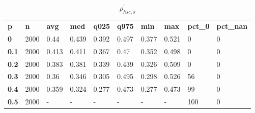 \begin{table}[h]
 \centering 
\footnotesize
\caption{$\rho_{hsc,s}^\prime $}
\label{tab:alphahscs}
\begin{tabular}[h]{| l l l l l l l l l l|
    } \hline
\textbf{ p} & \textbf{ n} & \textbf{ avg} & \textbf{ med} & \textbf{ q025} & \textbf{ q975} & \textbf{ min} & \textbf{ max} & \textbf{ pct\_0} & \textbf{ pct\_nan}
           \\
  \textbf{  0} & 2000 &  0.44 & 0.439 & 0.392 & 0.497 & 0.377 & 0.521 &   0 & 0
           \\
  \textbf{0.1} & 2000 & 0.413 & 0.411 & 0.367 &  0.47 & 0.352 & 0.498 &   0 & 0
           \\
  \textbf{0.2} & 2000 & 0.383 & 0.381 & 0.339 & 0.439 & 0.326 & 0.509 &   0 & 0
           \\
  \textbf{0.3} & 2000 &  0.36 & 0.346 & 0.305 & 0.495 & 0.298 & 0.526 &  56 & 0
           \\
  \textbf{0.4} & 2000 & 0.359 & 0.324 & 0.277 & 0.473 & 0.277 & 0.473 &  99 & 0
           \\
  \textbf{0.5} & 2000 & - & - & - & - & - & - & 100 & 0
           \\
 \hline \end{tabular}
 \end{table}
